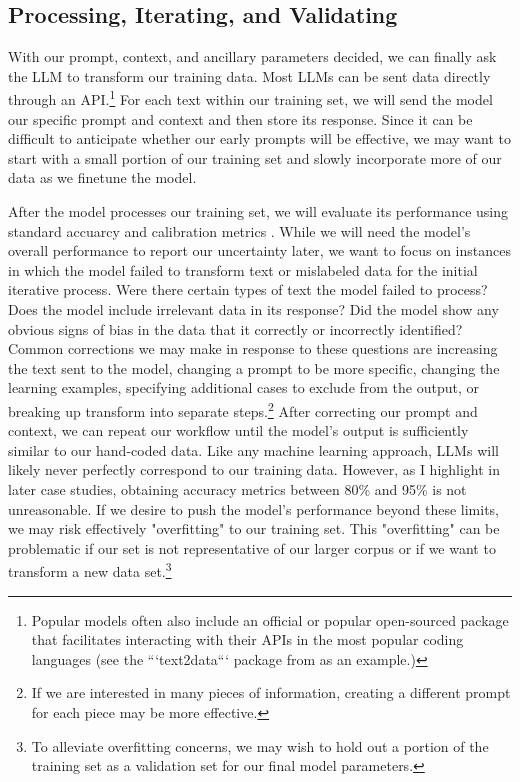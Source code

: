 \subsection{Processing, Iterating, and Validating}
    With our prompt, context, and ancillary parameters decided, we can finally ask the LLM to transform our training data. Most LLMs can be sent data directly through an API.\footnote{Popular models often also include an official or popular open-sourced package that facilitates interacting with their APIs in the most popular coding languages (see the ```text2data``` package from \citet{ornsteinHowTrainYour} as an example.)} For each text within our training set, we will send the model our specific prompt and context and then store its response. Since it can be difficult to anticipate whether our early prompts will be effective, we may want to start with a small portion of our training set and slowly incorporate more of our data as we finetune the model.

    After the model processes our training set, we will evaluate its performance using standard accuarcy and calibration metrics . While we will need the model's overall performance to report our uncertainty later, we want to focus on instances in which the model failed to transform text or mislabeled data for the initial iterative process. Were there certain types of text the model failed to process? Does the model include irrelevant data in its response? Did the model show any obvious signs of bias in the data that it correctly or incorrectly identified? Common corrections we may make in response to these questions are increasing the text sent to the model, changing a prompt to be more specific, changing the learning examples, specifying additional cases to exclude from the output, or breaking up transform into separate steps.\footnote{If we are interested in many pieces of information, creating a different prompt for each piece may be more effective.} After correcting our prompt and context, we can repeat our workflow until the model's output is sufficiently similar to our hand-coded data. Like any machine learning approach, LLMs will likely never perfectly correspond to our training data. However, as I highlight in later case studies, obtaining accuracy metrics between 80\% and 95\% is not unreasonable. If we desire to push the model's performance beyond these limits, we may risk effectively "overfitting" to our training set. This "overfitting" can be problematic if our set is not representative of our larger corpus or if we want to transform a new data set.\footnote{To alleviate overfitting concerns, we may wish to hold out a portion of the training set as a validation set for our final model parameters.}  

